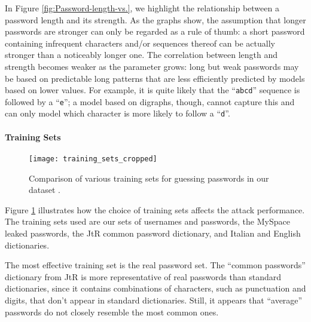 \documentclass[a4paper,twocolumn]{article}
\begin{document}
In Figure \ref{fig:Password-length-vs.}, we highlight the relationship
between a password length and its strength. As the graphs show, the
assumption that longer passwords are stronger can only be regarded
as a rule of thumb: a short password containing infrequent characters
and/or sequences thereof can be actually stronger than a noticeably
longer one. The correlation between length and strength becomes weaker
as the  parameter grows: long but weak passwords may be based
on predictable long patterns that are less efficiently predicted by
models based on lower  values. For example, it is quite likely
that the {}``\texttt{abcd}'' sequence is followed by a {}``\texttt{e}'';
a model based on digraphs, though, cannot capture this and can only
model which character is more likely to follow a {}``\texttt{d}''.


\paragraph{Training Sets}

\begin{figure}
\begin{centering}
\texttt{[image: training\_sets\_cropped]}
\par\end{centering}

\caption{\label{fig:Comparing-training-sets.}Comparison of various training
sets for guessing passwords in our dataset .}

\end{figure}


Figure \ref{fig:Comparing-training-sets.} illustrates how the choice
of training sets affects the attack performance. The training sets
used are our sets of usernames and passwords, the MySpace leaked passwords,
the JtR common password dictionary, and Italian and English dictionaries.

The most effective training set is the real password set. The {}``common
passwords'' dictionary from\emph{ }JtR is more representative of
real passwords than standard dictionaries, since it contains combinations
of characters, such as punctuation and digits, that don't appear in
standard dictionaries. Still, it appears that {}``average'' passwords
do not closely resemble the most common ones.
\end{document}
